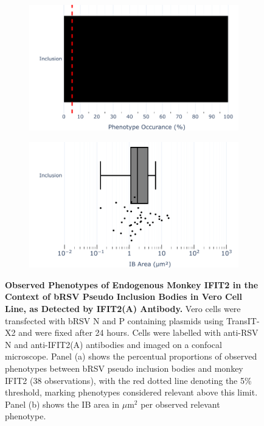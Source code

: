 \begin{figure}
    \begin{subfigure}{0.495\textwidth}
        \caption{}
        \includegraphics[width=1\linewidth]{09. Chapter 4/Figs/01. pIB/03. IFIT2/02. IFIT2A/07. bar_i2a_vero_bnbp.pdf} 
    \end{subfigure}
    \begin{subfigure}{0.495\textwidth}
        \caption{}
        \includegraphics[width=1\linewidth]{09. Chapter 4/Figs/01. pIB/03. IFIT2/02. IFIT2A/08. box_i2a_vero_bnbp.pdf}
    \end{subfigure}
    \caption[Observed Phenotypes of Endogenous Monkey IFIT2 in the Context of bRSV Pseudo Inclusion Bodies in Vero Cell Line, as Detected by IFIT2(A) Antibody.]{\textbf{Observed Phenotypes of Endogenous Monkey IFIT2 in the Context of bRSV Pseudo Inclusion Bodies in Vero Cell Line, as Detected by IFIT2(A) Antibody.} Vero cells were transfected with bRSV N and P containing plasmids using TransIT-X2 and were fixed after 24 hours. Cells were labelled with anti-RSV N and anti-IFIT2(A) antibodies and imaged on a confocal microscope. Panel (a) shows the percentual proportions of observed phenotypes between bRSV pseudo inclusion bodies and monkey IFIT2 (38 observations), with the red dotted line denoting the 5\% threshold, marking phenotypes considered relevant above this limit. Panel (b) shows the IB area in \(\mu \mbox{m}^2\) per observed relevant phenotype.}
    \label{fig:Observed Phenotypes of Endogenous Monkey IFIT2 in the Context of bRSV Pseudo Inclusion Bodies in Vero Cell Line, as Detected by IFIT2(A) Antibody}
\end{figure}

